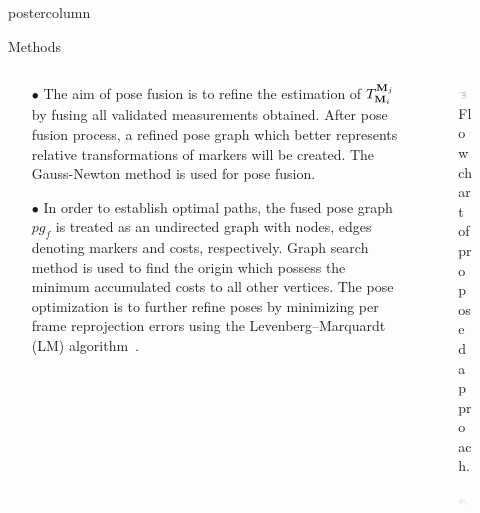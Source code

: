 \documentclass{beamer}
\begin{document}
\begin{frame}
\begin{columns}
\begin{column}{.57\textwidth}
\begin{beamercolorbox}[center]{postercolumn}
\begin{minipage}{.98\textwidth}
{\begin{myblock}{Methods}
\begin{minipage}[0.3\textheight]{\textwidth}
\begin{columns}[T]
\begin{column}{0.5\textwidth}
\begin{enumerate}[label=,labelindent=\parindent,leftmargin=*]
\item[$\bullet$] The aim of pose fusion is to refine the estimation of  ${{T}_{\bold{M}_i}^{\bold{M}_j}}$ by fusing all validated measurements obtained. After pose fusion process, a refined pose graph which better represents relative transformations of markers will be created. The Gauss-Newton method is used for pose fusion.

\item[$\bullet$] In order to establish optimal paths, the fused pose graph $pg_f$ is treated as an undirected graph with nodes, edges denoting markers and costs, respectively. Graph search method is used to find the origin which possess the minimum accumulated costs to all other vertices. The pose optimization is to further refine poses by minimizing per frame reprojection errors using the Levenberg–Marquardt (LM) algorithm~\cite{madsen1999methods}.
\end{enumerate}
\end{column}
\begin{column}{0.5\textwidth}
\begin{figure}
\includegraphics[width=0.72\textwidth]{img/flow.png}
\caption{Flowchart of proposed approach.}
\label{fig:flowchart}
\end{figure}
\begin{figure}
\includegraphics[width=0.72\textwidth]{img/ds.png}

\end{figure}
\end{column}
\end{columns}
\end{minipage}
\end{myblock}}
\end{minipage}
\end{beamercolorbox}
\end{column}
\end{columns}
\end{frame}
\end{document}
